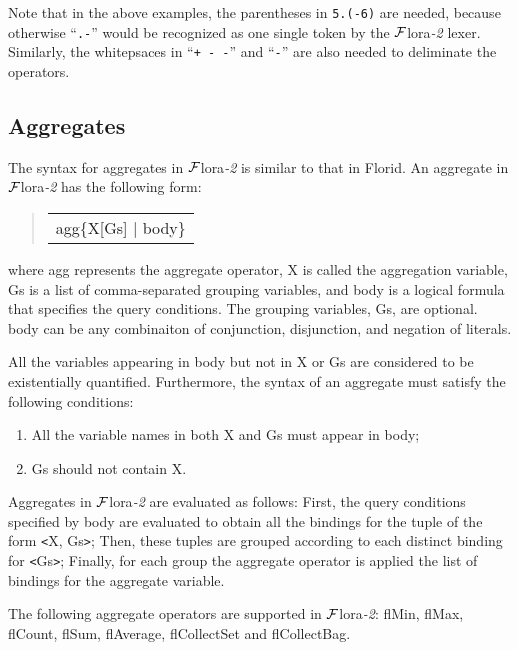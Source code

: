 \documentclass[11pt]{article}
\newenvironment{qrules}{\begin{quote}\sf\begin{tabular}[t]{l}}%
{\end{tabular}\end{quote}}
\newcommand{\FLORA}{{\mbox{${\cal F}${\sc lora}\rm\emph{-2}}}\xspace}
\newcommand{\FLORID}{{\mbox{\sc Florid}}\xspace}
\begin{document}
Note that in the above examples, the parentheses in {\tt 5.(-6)} are needed,
because otherwise ``{\tt .-}'' would be recognized as one single token by
the \FLORA lexer. Similarly, the whitepsaces in \mbox{``{\tt + - -}''} and
\mbox{``{\tt * -}''} are also needed to deliminate the operators.


\subsection{Aggregates}


The syntax for aggregates in \FLORA is similar to that in \FLORID. An
aggregate in \FLORA has the following form:
\begin{qrules}
agg\{X[Gs] $|$ body\}
\end{qrules}
%
where {\sf agg} represents the aggregate operator, {\sf X} is called the
aggregation variable, {\sf Gs} is a list of comma-separated grouping
variables, and {\sf body} is a logical formula that specifies the
query conditions. The grouping variables, {\sf Gs}, are optional. {\sf body}
can be any combinaiton of conjunction, disjunction, and negation of literals.

All the variables appearing in {\sf body} but not in {\sf X} or {\sf Gs} are
considered to be existentially quantified. Furthermore, the syntax of an
aggregate must satisfy the following conditions:
\begin{enumerate}
\item All the variable names in both {\sf X} and {\sf Gs} must
appear in {\sf body};
\item {\sf Gs} should not contain {\sf X}.
\end{enumerate}

Aggregates in \FLORA are evaluated as follows: First, the query
conditions specified by {\sf body} are evaluated to obtain all the bindings
for the tuple of the form {\sf \texttt{<}X, Gs\texttt{>}}; Then, these
tuples are grouped according to each distinct binding for
{\sf \texttt{<}Gs\texttt{>}}; Finally, for each group the aggregate operator
is applied the list of bindings for the aggregate variable.


%
The following aggregate operators are supported in \FLORA: {\sf flMin}, {\sf flMax},
{\sf flCount}, {\sf flSum}, {\sf flAverage}, {\sf flCollectSet} and {\sf flCollectBag}.
\end{document}
